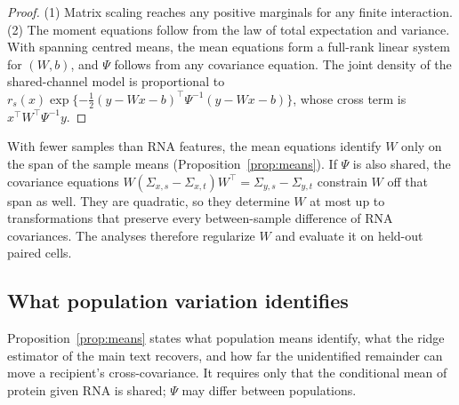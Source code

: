 \begin{proof}
(1) Matrix scaling reaches any positive marginals for any finite interaction.
(2) The moment equations follow from the law of total expectation and
variance. With spanning centred means, the mean equations form a full-rank
linear system for $(W,b)$, and $\Psi$ follows from any covariance equation.
The joint density of the shared-channel model is proportional to
$r_s(x)\exp\{-\frac12(y-Wx-b)^\top\Psi^{-1}(y-Wx-b)\}$, whose cross term is
$x^\top W^\top\Psi^{-1}y$.
\end{proof}

With fewer samples than RNA features, the mean equations identify $W$ only on
the span of the sample means (Proposition~\ref{prop:means}). If $\Psi$ is
also shared, the covariance equations
$W(\Sigma_{x,s}-\Sigma_{x,t})W^\top=\Sigma_{y,s}-\Sigma_{y,t}$ constrain $W$
off that span as well. They are quadratic, so they determine $W$ at most up to
transformations that preserve every between-sample difference of RNA
covariances. The analyses therefore regularize $W$ and evaluate it on held-out
paired cells.

\subsection*{What population variation identifies}
Proposition~\ref{prop:means} states what population means identify, what the
ridge estimator of the main text recovers, and how far the unidentified
remainder can move a recipient's cross-covariance. It requires only that the
conditional mean of protein given RNA is shared; $\Psi$ may differ between
populations.

